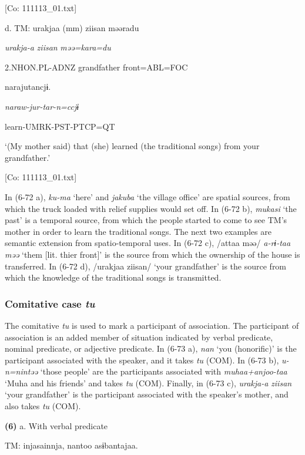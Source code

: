      [Co: 111113\_01.txt]

  d.  TM:  urakjaa  (mm)  ziisan  məəradu

      \textit{urakja-a}    \textit{ziisan}  \textit{məə=kara=du}

      2.NHON.PL-ADNZ    grandfather  front=ABL=FOC

      narajutancjɨ.

      \textit{naraw-jur-tar-n=ccjɨ}

      learn-UMRK-PST-PTCP=QT

      ‘(My mother said) that (she) learned (the traditional songs) from your grandfather.’

      [Co: 111113\_01.txt]

In (6-72 a), \textit{ku-ma} ‘here’ and \textit{jakuba} ‘the village office’ are spatial sources, from which the truck loaded with relief supplies would set off. In (6-72 b), \textit{mukasi} ‘the past’ is a temporal source, from which the people started to come to see TM’s mother in order to learn the traditional songs. The next two examples are semantic extension from spatio-temporal uses. In (6-72 c), /attaa məə/ \textit{a-rɨ-taa} \textit{məə} ‘them [lit. thier front]’ is the source from which the ownership of the house is transferred. In (6-72 d), /urakjaa ziisan/ ‘your grandfather’ is the source from which the knowledge of the traditional songs is transmitted.

\subsubsection{ Comitative case \textit{tu}}

The comitative \textit{tu} is used to mark a participant of association. The participant of association is an added member of situation indicated by verbal predicate, nominal predicate, or adjective predicate. In (6-73 a), \textit{nan} ‘you (honorific)’ is the participant associated with the speaker, and it takes \textit{tu} (COM). In (6-73 b), \textit{u-n=nintəə} ‘those people’ are the participants associated with \textit{muhaa+anjoo-taa} ‘Muha and his friends’ and takes \textit{tu} (COM). Finally, in (6-73 c), \textit{urakja-a} \textit{ziisan} ‘your grandfather’ is the participant associated with the speaker’s mother, and also takes \textit{tu} (COM).

\textbf{(6)}  a.  With verbal predicate

    TM:  injasainnja,  nantoo  asɨbantajaa.

